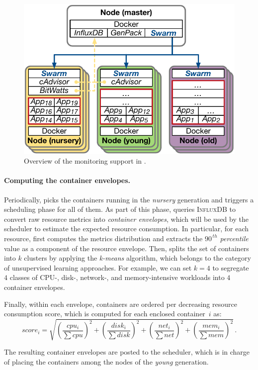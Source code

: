 \begin{figure}[t]
\centering
\includegraphics[width=.7\linewidth]{Figures/monitoring}
\caption{Overview of the monitoring support in \GP{}.}
\label{fig:monitoring}
\end{figure}

\paragraph{Computing the container envelopes.}

Periodically, \GP{} picks the containers running in the \emph{nursery} generation and triggers a scheduling phase for all of them.
As part of this phase, \GP{} queries \textsc{InfluxDB} to convert raw resource metrics into \emph{container envelopes}, which will be used by the scheduler to estimate the expected resource consumption.
In particular, for each resource, \GP{} first computes the metrics distribution and extracts the \emph{$90^{\,th}$ percentile} value as a component of the resource envelope.
Then, \GP{} splits the set of containers into $k$ clusters by applying the \emph{k-means} algorithm, which belongs to the category of unsupervised learning approaches.
For example, we can set $k=4$ to segregate $4$ classes of CPU-, disk-, network-, and memory-intensive workloads into $4$ container envelopes.

Finally, within each envelope, containers are ordered per decreasing resource consumption score, which is computed for each enclosed container~$i$ as:
\small
\[score_i=\sqrt{(\frac{cpu_i}{\sum{cpu}})^2+(\frac{disk_i}{\sum{disk}})^2+(\frac{net_i}{\sum{net}})^2+(\frac{mem_i}{\sum{mem}})^2}\,.\]
\normalsize

The resulting container envelopes are posted to the \GP{} scheduler, which is in charge of placing the containers among the nodes of the \emph{young} generation.

